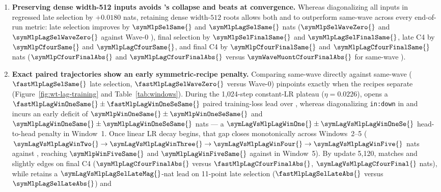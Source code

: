 \begin{enumerate}
\item \textbf{Preserving dense width-512 inputs avoids 's
  collapse and beats  at convergence.} Whereas diagonalizing all
  inputs in  regressed late selection by $+0.0180$ nats,
  retaining dense width-$512$ roots allows both  and
   to outperform same-wave  across every
  end-of-run metric: late selection improves by $\symMlpSelSame{}$ and
  $\symMlpLagSelSame{}$ nats ($\symMlpSelWaveZero{}$ and
  $\symMlpLagSelWaveZero{}$ against Wave-0 ), final selection by
  $\symMlpSelFinalSame{}$ and $\symMlpLagSelFinalSame{}$, late C4 by
  $\symMlpCfourSame{}$ and $\symMlpLagCfourSame{}$, and final C4 by
  $\symMlpCfourFinalSame{}$ and $\symMlpLagCfourFinalSame{}$ nats
  ($\symMlpCfourFinalAbs{}$ and $\symMlpLagCfourFinalAbs{}$ versus
  $\symWaveMuontCfourFinalAbs{}$ for same-wave ).
\item \textbf{Exact paired trajectories show an early symmetric-recipe
  penalty.} Comparing same-wave 
  directly against same-wave  ($\fastMlpLagSelSame{}$ late
  selection, $\fastMlpLagSelWaveZero{}$ versus Wave-0) pinpoints exactly when
  the recipes separate (Figure~\ref{fig:wt-lag-training} and
  Table~\ref{tab:windows}). During the
  1{,}024-step constant-LR plateau ($\eta=0.0226$),  opens a
  $\fastMlpLagWinOneSame{} \pm \fastMlpLagWinOneSeSame{}$ paired training-loss
  lead over , whereas diagonalizing \texttt{in:down} in
   and  incurs an early deficit of
  $\symMlpWinOneSame{} \pm \symMlpWinOneSeSame{}$ and
  $\symMlpLagWinOneSame{} \pm \symMlpLagWinOneSeSame{}$ nats --- a
  $\symLagVsMlpLagWinOne{} \pm \symLagVsMlpLagWinOneSe{}$ head-to-head penalty
  in Window~1. Once linear LR decay begins, that gap closes monotonically across
  Windows~2--5 ($\symLagVsMlpLagWinTwo{} \to \symLagVsMlpLagWinThree{} \to
  \symLagVsMlpLagWinFour{} \to \symLagVsMlpLagWinFive{}$ nats against
  , reaching $\symMlpWinFiveSame{}$ and
  $\symMlpLagWinFiveSame{}$ against  in Window~5). By update
  5{,}120,  matches and slightly edges  on
  final C4 ($\symMlpLagCfourFinalAbs{}$ versus $\fastMlpLagCfourFinalAbs{}$,
  $\symLagVsMlpLagCfourFinal{}$ nats), while  retains a
  $\symLagVsMlpLagSelLateMag{}$-nat lead on 11-point late selection
  ($\fastMlpLagSelLateAbs{}$ versus $\symMlpLagSelLateAbs{}$) and

\end{enumerate}
